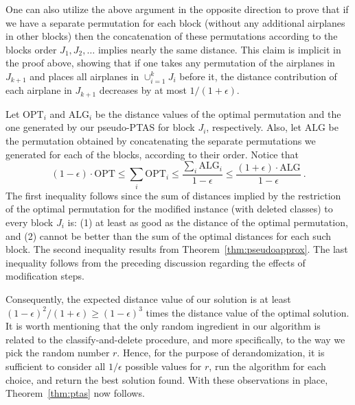 \documentclass[11pt]{article}
\theoremstyle{plain}
\theoremstyle{definition}
\newcommand{\opt}{\mathrm{OPT}}
\newcommand{\alg}{\mathrm{ALG}}
\begin{document}
One can also utilize the above argument in the opposite direction to prove that if we have a separate permutation for each block (without any additional airplanes in other blocks) then the concatenation of these permutations according to the blocks order $J_1, J_2, \ldots$ implies nearly the same distance. This claim is implicit in the proof above, showing that if one takes any permutation of the airplanes in $J_{k+1}$ and places all airplanes in $\cup_{i=1}^k J_i$ before it, the distance contribution of each airplane in $J_{k+1}$ decreases by at most $1/ (1+\epsilon)$.

\smallskip {} Let $\opt_i$ and $\alg_i$ be the distance values of the  optimal permutation and the one generated by our pseudo-PTAS for block $J_i$, respectively. Also, let $\alg$ be the permutation obtained by concatenating the separate permutations we generated for each of the blocks, according to their order. Notice that
$$
(1 - \epsilon) \cdot \opt \leq \sum_i \opt_i \leq \frac{\sum_i \alg_i}{1 - \epsilon} \leq \frac{(1+\epsilon) \cdot \alg}{1-\epsilon} \ .
$$
The first inequality follows since the sum of distances implied by the restriction of the optimal permutation for the modified instance (with deleted classes) to every block $J_i$ is: (1) at least as good as the distance of the optimal permutation, and (2) cannot be better than the sum of the optimal distances for each such block. The second inequality results from Theorem~\ref{thm:pseudoapprox}. The last inequality follows from the preceding discussion regarding the effects of modification steps.

Consequently, the expected distance value of our solution is at least $(1-\epsilon)^2/(1+\epsilon) \geq (1-\epsilon)^3$ times the distance value of the optimal solution. It is worth mentioning that the only random ingredient in our algorithm is related to the classify-and-delete procedure, and more specifically, to the way we pick the random number $r$. Hence, for the purpose of derandomization, it is sufficient to consider all $1 / \epsilon$ possible values for $r$, run the algorithm for each choice, and return the best solution found. With these observations in place, Theorem~\ref{thm:ptas} now follows.
\end{document}
